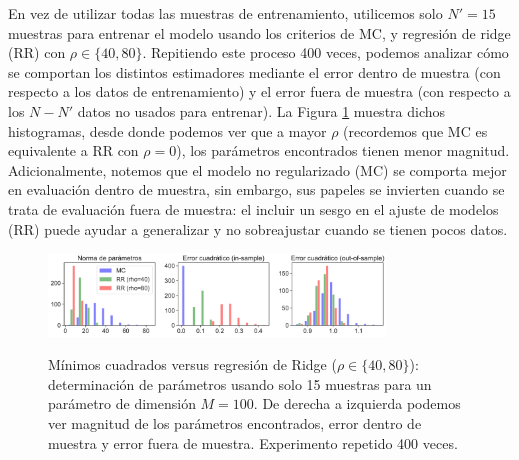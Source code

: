  En vez de utilizar todas las muestras de entrenamiento, utilicemos solo $N'=15$ muestras para entrenar el modelo usando los criterios de MC, y regresión de ridge (RR) con $\rho\in\{40,80\}$. Repitiendo este proceso 400 veces, podemos analizar cómo se comportan los distintos estimadores mediante el error dentro de muestra (con respecto a los datos de entrenamiento) y el error fuera de muestra (con respecto a los $N-N'$ datos no usados para entrenar). La Figura \ref{fig:MCvsRR_Synth} muestra dichos histogramas, desde donde podemos ver que a mayor $\rho$ (recordemos que MC es equivalente a RR con $\rho=0$), los parámetros encontrados tienen menor magnitud. Adicionalmente, notemos que el modelo no regularizado (MC) se comporta mejor en evaluación dentro de muestra, sin embargo, sus papeles se invierten cuando se trata de evaluación fuera de muestra: el incluir un sesgo en el ajuste de modelos (RR) puede ayudar a generalizar y no sobreajustar cuando se tienen pocos datos. 

 \begin{figure}[H]
	\centering
	\includegraphics[width=0.8\textwidth]{img/cap2_bias-variance.pdf}\\
	\caption{Mínimos cuadrados versus regresión de Ridge ($\rho\in\{40,80\}$): determinación de parámetros usando solo 15 muestras para un parámetro de dimensión $M=100$. De derecha a izquierda podemos ver magnitud de los parámetros encontrados, error dentro de muestra y error fuera de muestra. Experimento repetido 400 veces.}
	\label{fig:MCvsRR_Synth}  
\end{figure}

